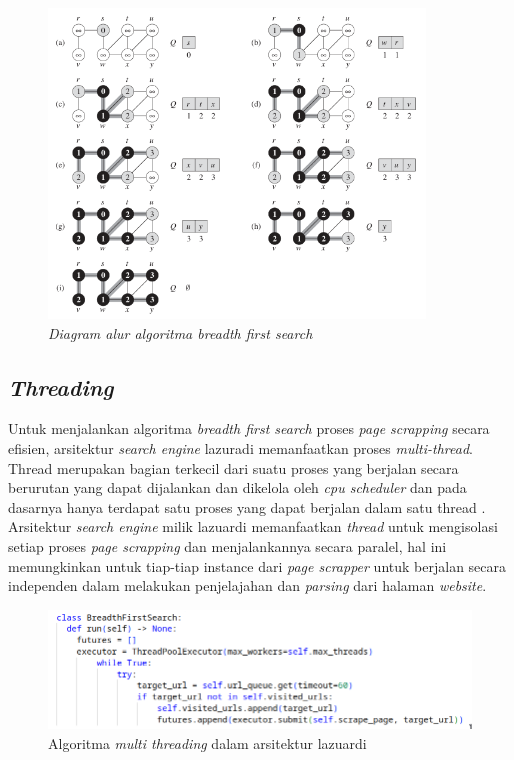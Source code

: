\begin{figure}[H]
	\centering
	\includegraphics[keepaspectratio, width=10cm]{gambar/bfs-diagram.png}
  \caption{\emph{Diagram alur algoritma \emph{breadth first search} \citep{cormen2009introduction}}}
	\label{gambar:bfs_diagram} 
\end{figure}

\subsection{\emph{Threading}}

Untuk menjalankan algoritma \emph{breadth first search} proses \emph{page scrapping} secara efisien, arsitektur \emph{search engine} lazuradi memanfaatkan proses \emph{multi-thread}. Thread merupakan bagian terkecil dari suatu proses yang berjalan secara berurutan yang dapat dijalankan dan dikelola oleh \emph{cpu scheduler} dan pada dasarnya hanya terdapat satu proses yang dapat berjalan dalam satu thread \citep{operatingsystemconcept}. Arsitektur \emph{search engine} milik lazuardi memanfaatkan \emph{thread} untuk mengisolasi setiap proses \emph{page scrapping} dan menjalankannya secara paralel, hal ini memungkinkan untuk tiap-tiap instance dari \emph{page scrapper} untuk berjalan secara independen dalam melakukan penjelajahan dan \emph{parsing} dari halaman \emph{website}.

\begin{figure}[H]
	\centering
	\includegraphics[keepaspectratio, width=15cm]{gambar/threading-python.png}
  \caption{Algoritma \emph{multi threading} dalam arsitektur lazuardi \citep{lazuardithesis}}
	\label{gambar:threading_python} 
\end{figure}
 
